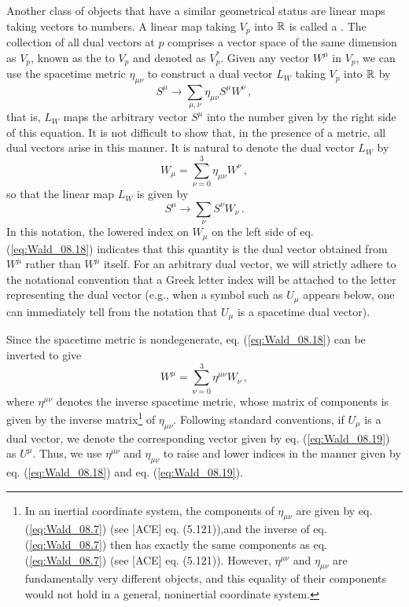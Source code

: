 Another class of objects that have a similar geometrical status are linear maps taking vectors to numbers. A linear map taking $V_p$ into $\mathbb{R}$ is called a . The collection of all dual vectors at $p$ comprises a vector space of the same dimension as $V_p$, known as the  to $V_p$ and denoted as $V^*_p$. Given any vector $W^\mu$ in $V_p$, we can use the spacetime metric $\eta_{\mu\nu}$ to construct a dual vector $L_W$ taking $V_p$ into $\mathbb{R}$ by
\begin{equation}\label{eq:Wald_08.17}
S^\mu \longrightarrow \sum_{\mu,\nu}\eta_{\mu\nu} S^\mu W^\nu\,,
\end{equation}
that is, $L_W$ maps the arbitrary vector $S^\mu$ into the number given by the right side of this equation. It is not difficult to show that, in the presence of a metric, all dual vectors arise in this manner. It is natural to denote the dual vector $L_W$ by  
\begin{equation}\label{eq:Wald_08.18}
W_\mu = \sum_{\nu=0}^3 \eta_{\mu\nu} W^\nu\,,
\end{equation}
so that the linear map $L_W$ is given by $$S^\mu \longrightarrow \sum_\nu S^\nu W_\nu\,.$$
In this notation, the lowered index on $W_\mu$ on the left side of eq. (\ref{eq:Wald_08.18}) indicates that this quantity is the dual vector obtained from $W^\mu$ rather than $W^\mu$ itself. For an arbitrary dual vector, we will strictly adhere to the notational convention that a  Greek letter index will be attached to the letter representing the dual vector (e.g., when a symbol such as $U_\mu$ appears below, one can immediately tell from the notation that $U_\mu$ is a spacetime dual vector).

Since the spacetime metric is nondegenerate, eq. (\ref{eq:Wald_08.18}) can be inverted to give 
\begin{equation}\label{eq:Wald_08.19}
W^\mu = \sum_{\nu=0}^3 \eta^{\mu\nu} W_\nu\,,
\end{equation}
where $\eta^{\mu\nu}$ denotes the inverse spacetime metric, whose matrix of components is given by the inverse matrix\footnote{In an inertial coordinate system, the components of $\eta_{\mu\nu}$ are given by eq. (\ref{eq:Wald_08.7}) (see [ACE] eq. (5.121)),and the inverse of eq.(\ref{eq:Wald_08.7}) then has exactly the same components as eq. (\ref{eq:Wald_08.7}) (see [ACE] eq. (5.121)). However, $\eta^{\mu\nu}$ and $\eta_{\mu\nu}$ are fundamentally very different objects, and this equality of their components would not hold in a general, noninertial coordinate system.} of $\eta_{\mu\nu}$. Following standard conventions, if $U_\mu$ is a dual vector, we denote the corresponding vector given by eq. (\ref{eq:Wald_08.19}) as $U^\mu$. Thus, we use $\eta^{\mu\nu}$ and $\eta_{\mu\nu}$ to raise and lower indices in the manner given by eq. (\ref{eq:Wald_08.18}) and eq. (\ref{eq:Wald_08.19}).

